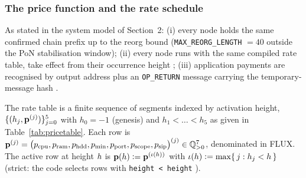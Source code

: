\subsubsection{The price function and the rate schedule}

\begin{assumption}
\label{asm:settle}
As stated in the system model of Section~2: (i) every node holds the same confirmed chain prefix up
to the reorg bound (\texttt{MAX\_REORG\_LENGTH} $=40$ outside the PoN stabilisation window);
(ii) every node runs \FluxOS with the same compiled rate table, 
take effect from their occurrence height ;
(iii) application payments are recognised by output address plus an \texttt{OP\_RETURN} message
carrying the temporary-message hash .
\end{assumption}

\begin{definition}
\label{def:ratetable}
The rate table is a finite sequence of segments indexed by activation height,
$\{(h_j, \mathbf{p}^{(j)})\}_{j=0}^{5}$ with $h_0 = -1$ (genesis) and $h_1 < \dots < h_5$ as given in
Table~\ref{tab:pricetable}. Each row is
$\mathbf{p}^{(j)} = \bigl(p_{\mathrm{cpu}}, p_{\mathrm{ram}}, p_{\mathrm{hdd}}, p_{\min},
p_{\mathrm{port}}, p_{\mathrm{scope}}, p_{\mathrm{sip}}\bigr)^{(j)} \in \mathbb{Q}_{>0}^{7}$,
denominated in FLUX. The active row at height $h$ is $\mathbf{p}(h) \vcentcolon=
\mathbf{p}^{(\iota(h))}$ with $\iota(h) \vcentcolon= \max\{\, j : h_j < h \,\}$ (strict: the
code selects rows with \texttt{height < height}
).
\end{definition}

